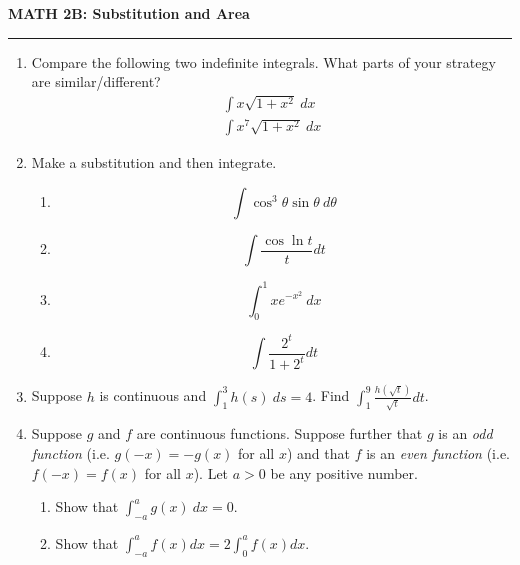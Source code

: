\documentclass[12pt]{article}
\begin{document}
\begin{center}
{\bf \Large MATH 2B: Substitution and Area}
\vspace{0.2cm}
\hrule
\end{center}

\begin{multicols*}{2}
	\begin{enumerate}
		\item Compare the following two indefinite integrals. What parts of your strategy are similar/different?
		\begin{gather*}
			\int x\sqrt{1+x^2}\ dx\\
			\int x^7\sqrt{1+x^2}\ dx
		\end{gather*}
		\vfill
		\item Make a substitution and then integrate.
		\begin{enumerate}
			\item \[
			\int \cos^3 \theta \sin \theta\ d\theta
			\]
			\vfill

			\item \[
			\int \frac{\cos \ln t}{t}dt
			\]
			\vfill

			\item \[
			\int_0^1xe^{-x^2}\ dx
			\]
			\vfill

			\item \[
			\int\frac{2^t}{1+2^t}dt
			\]
			\vfill\null\columnbreak
		\end{enumerate}

		\item Suppose $h$ is continuous and $\int_1^3h(s)\ ds = 4$. Find $\int_1^9\frac{h(\sqrt{t})}{\sqrt{t}}dt$.
		\vfill
		\item Suppose $g$ and $f$ are continuous functions. Suppose further that $g$ is an \textit{odd function} (i.e. $g(-x) = -g(x)$ for all $x$) and that $f$ is an \textit{even function} (i.e. $f(-x) = f(x)$ for all $x$). Let $a>0$ be any positive number.
		\begin{enumerate}
			\item Show that $\int_{-a}^ag(x)\ dx = 0$.
			\vfill
			\item Show that $\int_{-a}^af(x)dx = 2\int_0^af(x)dx$.
			\vfill\null\pagebreak
		\end{enumerate}


\end{enumerate}
\end{multicols*}
\end{document}
